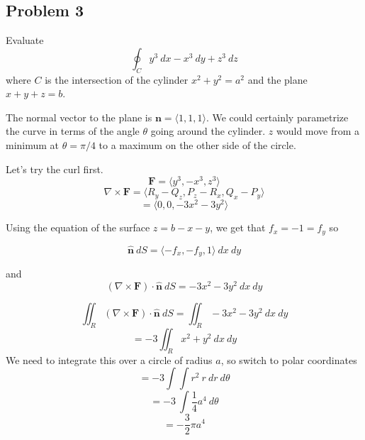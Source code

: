 \documentclass[11pt, oneside]{article}
\begin{document}
\subsection*{Problem 3}

Evaluate 
\[ \oint_C y^3 \ dx - x^3 \ dy + z^3 \ dz \]
where $C$ is the intersection of the cylinder $x^2 + y^2 = a^2$ and the plane $x+ y + z = b$.

The normal vector to the plane is $\mathbf{n} = \langle 1,1,1 \rangle$.  We could certainly parametrize the curve in terms of the angle $\theta$ going around the cylinder.  $z$ would move from a minimum at $\theta = \pi/4$ to a maximum on the other side of the circle.

Let's try the curl first.
\[ \mathbf{F} = \langle y^3, -x^3 , z^3 \rangle \]
\[ \nabla \times \mathbf{F} = \langle R_y - Q_z, P_z - R_x, Q_x - P_y \rangle \]
\[ = \langle 0, 0, -3x^2 - 3y^2 \rangle \]

Using the equation of the surface $z = b - x - y$, we get that $f_x =  -1 = f_y$ so 

\[ \hat{\mathbf{n}} \ dS = \langle -f_x,-f_y,1 \rangle \ dx \ dy \] 

and
\[ (\nabla \times \mathbf{F} ) \cdot \hat{\mathbf{n}} \ dS = -3x^2 - 3y^2 \ dx \ dy \]

\[ \iint_R (\nabla \times \mathbf{F}) \cdot \hat{\mathbf{n}} \ dS =  \iint_R -3x^2 - 3y^2 \ dx \ dy \]
\[ = -3 \iint_R x^2 + y^2 \ dx \ dy \]
We need to integrate this over a circle of radius $a$,
so switch to polar coordinates
\[ = -3 \int \int r^2 \ r \ dr \ d \theta \]
\[ = -3 \  \int \frac{1}{4} a^4 \ d \theta \]
\[ = -\frac{3}{2} \pi a^4 \]
\end{document}
